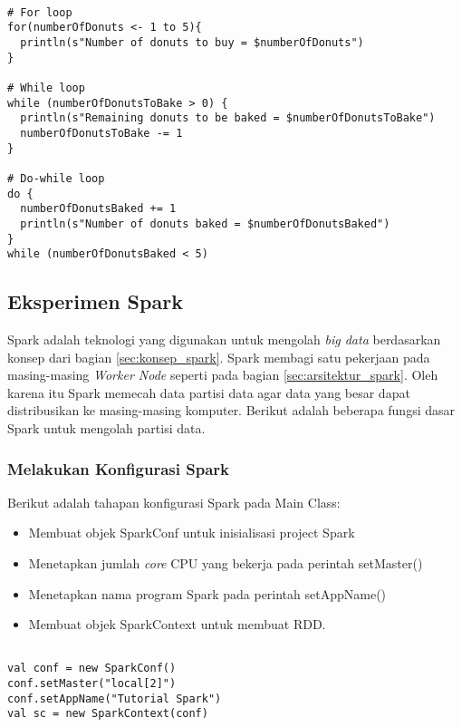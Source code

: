 \begin{lstlisting}[basicstyle=\ttfamily, frame=single,
	columns=fullflexible, keepspaces=true, breaklines=true, label=lst:perulangan, caption=Membuat Fungsi Perulangan pada Scala]
	
# For loop
for(numberOfDonuts <- 1 to 5){
  println(s"Number of donuts to buy = $numberOfDonuts")
}

# While loop
while (numberOfDonutsToBake > 0) {
  println(s"Remaining donuts to be baked = $numberOfDonutsToBake")
  numberOfDonutsToBake -= 1
}

# Do-while loop
do {
  numberOfDonutsBaked += 1
  println(s"Number of donuts baked = $numberOfDonutsBaked")
} 
while (numberOfDonutsBaked < 5)

\end{lstlisting}



\subsection{Eksperimen Spark}
Spark adalah teknologi yang digunakan untuk mengolah \textit{big data} berdasarkan konsep dari bagian \ref{sec:konsep_spark}. Spark membagi satu pekerjaan pada masing-masing \textit{Worker Node} seperti pada bagian \ref{sec:arsitektur_spark}. Oleh karena itu Spark memecah data partisi data agar data yang besar dapat distribusikan ke masing-masing komputer. Berikut adalah beberapa fungsi dasar Spark untuk mengolah partisi data.

\subsubsection{Melakukan Konfigurasi Spark}
Berikut adalah tahapan konfigurasi Spark pada Main Class:
\begin{itemize}
\item Membuat objek SparkConf untuk inisialisasi project Spark
\item Menetapkan jumlah \textit{core} CPU yang bekerja pada perintah setMaster()
\item Menetapkan nama program Spark pada perintah setAppName()
\item Membuat objek SparkContext untuk membuat RDD.

\end{itemize}

\begin{lstlisting}[basicstyle=\ttfamily, frame=single,
	columns=fullflexible, keepspaces=true, breaklines=true, label=ls_kepatuhan_1_1_1_logo_sharif_judge, caption=Konfigurasi Spark]
	
val conf = new SparkConf()
conf.setMaster("local[2]")
conf.setAppName("Tutorial Spark")
val sc = new SparkContext(conf)

\end{lstlisting}
  
